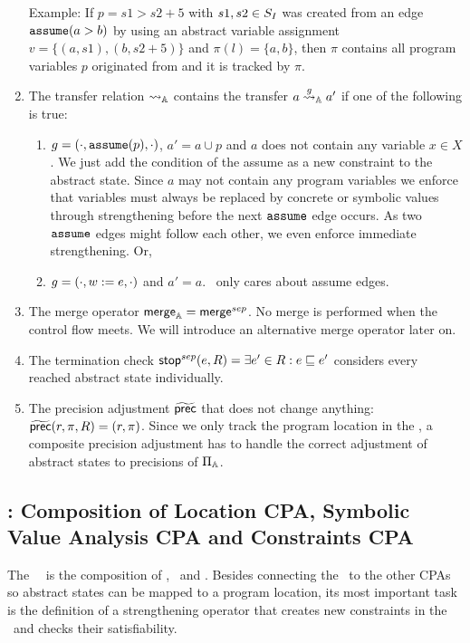 \begin{enumerate}[leftmargin=*,label=\arabic*.]
Example: If $p = s1 > s2 + 5$ with $s1, s2 \in S_I$ was created from an edge $\texttt{assume}(a > b)$ by using an abstract variable assignment $v = \{ (a, s1), (b, s2 + 5) \}$
and $\pi(l) = \{ a, b \}$, then $\pi$ contains all program variables $p$ originated from and it is tracked by $\pi$. 

\item The transfer relation $\rightsquigarrow_{\mathbb{A}}$ contains the transfer $a \overset{g}{\rightsquigarrow}_{\mathbb{A}} a'$ if one of the following is true:
	\begin{enumerate}[label=\alph*)]
		\item $g = (\cdot, \texttt{assume}(p), \cdot)$, $a' = a \cup p$ and
			$a$ does not contain any variable $x \in X$.
			We just add the condition of the assume as a new constraint to the abstract state.
			Since $a$ may not contain any program variables we enforce that
			variables must always be replaced by concrete or symbolic values through strengthening before the next $\texttt{assume}$ edge occurs.
			As two $\texttt{assume}$ edges might follow each other, we even enforce immediate strengthening.
			Or,
		\item $g = (\cdot, w := e, \cdot)$ and $a' = a$. \ConstraintsCPA\ only cares about assume edges.
	\end{enumerate}
	
\item The merge operator $\operatorname{\operatorname{\mathsf{merge}}}_{\mathbb{A}} = \operatorname{\operatorname{\mathsf{merge}}}^{sep}$. No merge is performed when the control flow meets. We will introduce an alternative merge operator later on.
\item The termination check $\operatorname{\operatorname{\mathsf{stop}}}^{sep}(e, R) = \exists e' \in R: e \sqsubseteq e'$ considers every reached abstract state individually.

\item
The precision adjustment $\operatorname{\widetilde{\operatorname{\operatorname{\mathsf{prec}}}}}$ that does not change anything: $\operatorname{\widetilde{\operatorname{\operatorname{\mathsf{prec}}}}}(r, \pi, R) = (r, \pi)$.
Since we only track the program location in the \locationCPA, a composite precision adjustment has to handle the correct adjustment of abstract states to precisions of $\Pi_{\mathbb{A}}$.

\end{enumerate}


\subsection{\SymbolicExecutionCPA : Composition of Location CPA, Symbolic Value Analysis CPA and Constraints CPA}
The \symbolicExecutionCPA\ \cite{Lemberger2015}\ is the composition of \locationCPA, \symbolicValueAnalysisCPA\ and \constraintsCPA.
Besides connecting the \locationCPA\ to the other CPAs so abstract states can be mapped to a program location, its most important task is the definition of a strengthening operator that creates new constraints in the \constraintsCPA\ and checks their satisfiability.

